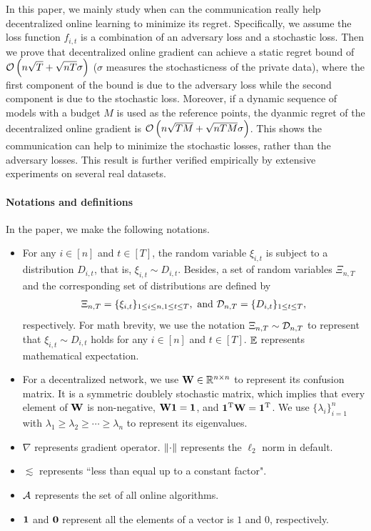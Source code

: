 \documentclass{article}
\begin{document}
In this paper, we mainly study when can the communication really help decentralized online learning to minimize its regret. Specifically, we assume the loss function $f_{i,t}$ is a combination of an adversary loss and a stochastic loss. Then we prove that decentralized online gradient can achieve a static regret bound of ${\mathcal{O}\left( n\sqrt{T} + \sqrt{nT}\sigma \right)}$ ($\sigma$ measures the stochasticness of the private data), where the first component of the bound is due to the adversary loss while the second component is due to the stochastic loss.
Moreover, if a dynamic sequence of models with a budget $M$ is used as the reference points, the dyanmic regret of the decentralized online gradient is ${\mathcal{O}\left( n\sqrt{TM} + \sqrt{nTM}\sigma \right)}$. This shows the communication can help to minimize the stochastic losses, rather than the adversary losses. This result is further verified empirically by extensive experiments on several real datasets.


\paragraph{Notations and definitions}
In the paper, we make the following notations.
\begin{itemize}
\item For any $i\in[n]$ and $t\in[T]$, the random variable $\xi_{i,t}$ is subject to a distribution $D_{i,t}$, that is, $\xi_{i,t} \sim D_{i,t}$. Besides, a set of random variables $\Xi_{n,T}$ and the corresponding set of distributions are defined by
\begin{align}
\nonumber
\Xi_{n,T} = \{ \xi_{i,t} \}_{1\le i \le n, 1 \le t \le T}, \text{~and~} \mathcal{D}_{n,T} = \{ D_{i,t} \}_{1 \le t \le T},
\end{align} respectively. For math brevity, we use the notation $\Xi_{n,T} \sim \mathcal{D}_{n,T}$ to represent that $\xi_{i,t} \sim D_{i,t}$ holds for any $i\in[n]$ and $t\in[T]$. $\mathop{\mathbb{E}}$ represents mathematical expectation.
\item For a decentralized network, we use ${\bf W} \in\mathbb{R}^{n\times n}$ to represent its confusion matrix. It is a symmetric doublely stochastic matrix, which implies that every element of ${\bf W}$ is non-negative, ${\bf W} {\bf 1} = {\bf 1}$, and ${\bf 1}^{\rm T}{\bf W}  = {\bf 1}^{\rm T}$. We use $\{\lambda_i\}_{i=1}^n$ with $\lambda_1 \ge \lambda_2 \ge \cdots \ge \lambda_n$ to represent its eigenvalues. 
\item $\nabla$ represents gradient operator. $\left\lVert\cdot\right\rVert$ represents the $\ell_2$ norm in default.
\item $\lesssim$ represents ``less than equal up to a constant factor".
\item ${\mathcal{A}}$ represents the set of all online algorithms.
\item ${\bf 1}$ and ${\bf 0}$ represent all the elements of a vector is $1$ and $0$, respectively.
\end{itemize} 
    
\end{document}
